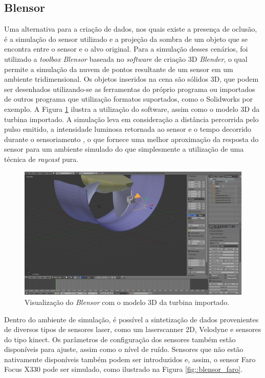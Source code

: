 \subsection{Blensor}

Uma alternativa para a criação de dados, nos quais existe a presença de oclusão,
é a simulação do sensor utilizado e a projeção da sombra de um objeto que se
encontra entre o sensor e o alvo original. Para a simulação desses cenários, foi
utilizado a \textit{toolbox Blensor}\footnotemark
{} baseada no \textit{software} de criação 3D
\textit{Blender}\footnotemark {}, o qual
permite a simulação da nuvem de pontos resultante de um sensor em um ambiente
tridimensional. Os objetos inseridos na cena são sólidos 3D, que podem ser
desenhados utilizando-se as ferramentas do próprio programa ou importados de
outros programa que utilização formatos suportados, como o Solidworks por
exemplo. A Figura \ref{fig::blensor_screen} ilustra a utilização do software,
assim como o modelo 3D da turbina importado. A simulação leva em consideração a
distância percorrida pelo pulso emitido, a intensidade luminosa retornada ao
sensor e o tempo decorrido durante o sensoriamento \cite{Gschwandtner2011}, o
que fornece uma melhor aproximação da resposta do sensor para um ambiente
simulado do que simplesmente a utilização de uma técnica de \textit{raycast} pura.

\begin{figure}[h!]
	\centering
	\includegraphics[width=0.9\columnwidth]{figs/calibracao/blensor_screen}
	\caption{Visualização do \textit{Blensor} com o modelo 3D da turbina
	importado.}
    \label{fig::blensor_screen}
\end{figure}

Dentro do ambiente de simulação, é possível a sintetização de dados provenientes
de diversos tipos de sensores laser, como um laserscanner 2D, Velodyne e
sensores do tipo kinect. Os parâmetros de configuração dos sensores também estão
disponíveis para ajuste, assim como o nível de ruído. Sensores que não estão
nativamente disponíveis também podem ser introduzidos e, assim, o sensor Faro
Focus X330 pode ser simulado, como ilustrado na Figura \ref{fig::blensor_faro}.

